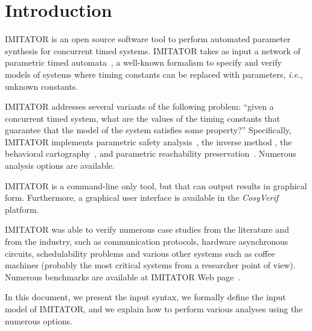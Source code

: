 \documentclass[a4paper,11pt]{report}
\newcommand{\CosyVerif}{\emph{CosyVerif}}
\newcommand{\imitator}{\textsf{IMITATOR}}
\newcommand{\imitatorversion}{2.7}
\newcommand{\ie}{\textcolor{colorok}{\textit{i.e.}, }}
\begin{document}
\newpage




\chapter{Introduction}

\imitator{} is an open source software tool to perform automated parameter synthesis for concurrent timed systems.
\imitator{} takes as input a network of parametric timed automata~\cite{AHV93}, a well-known formalism to specify and verify models of systems where timing constants can be replaced with parameters, \ie{} unknown constants.

\imitator{} addresses several variants of the following problem:
``given a concurrent timed system, what are the values of the timing constants that guarantee that the model of the system satisfies some property?''
Specifically, \imitator{} implements parametric safety analysis~\cite{AHV93,JLR15}, the inverse method \cite{ACEF09,AM15}, the behavioral cartography~\cite{AF10}, and parametric reachability preservation~\cite{ALNS15}.
Numerous analysis options are available.

\imitator{} is a command-line only tool, but that can output results in graphical form.
Furthermore, a graphical user interface is available in the \CosyVerif{} platform.

\imitator{} was able to verify numerous case studies from the literature and from the industry, such as communication protocols, hardware asynchronous circuits, schedulability problems and various other systems such as coffee machines (probably the most critical systems from a researcher point of view).
Numerous benchmarks are available at \imitator{} Web page~\cite{imitator}.

In this document, we present the input syntax, we formally define the input model of \imitator{}, and we explain how to perform various analyses using the numerous options.





\end{document}
